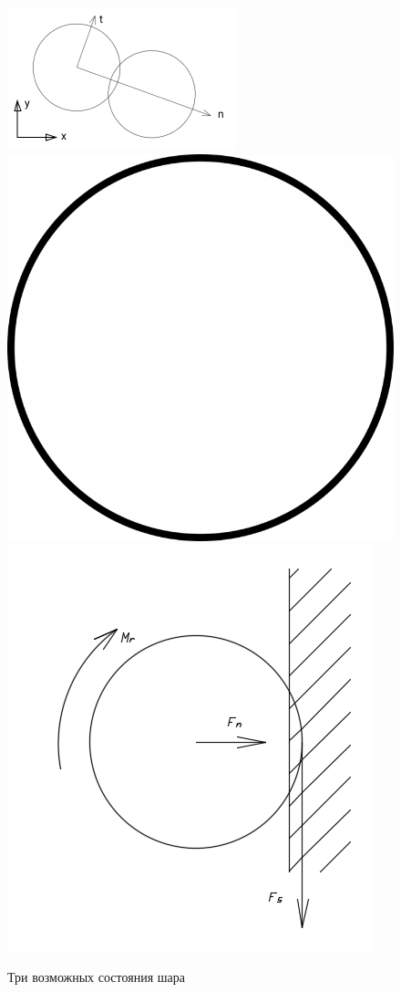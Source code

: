 \documentclass[c]{beamer}  %
\begin{document}
\begin{frame}
\frametitle{\insertsection} 
\framesubtitle{\insertsubsection}

\begin{figure}[h!]
	\centering
	\vspace*{-2cm}
	\includegraphics[width=0.5\textheight]{local}
	\includegraphics[width=0.3\textheight]{ball_simple}
	\includegraphics[width=0.4\textheight]{ball_wall}
	\caption{Три возможных состояния шара}
\end{figure} 
\end{frame}
\end{document}
